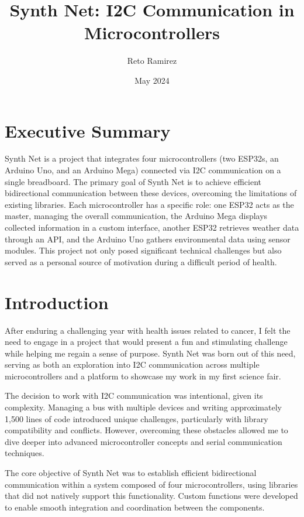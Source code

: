 \documentclass[a4paper,12pt]{report}
\title{Synth Net: I2C Communication in Microcontrollers}
\author{Reto Ramirez}
\date{May 2024}
\begin{document}
\maketitle

\tableofcontents
\newpage

\chapter*{Executive Summary}
Synth Net is a project that integrates four microcontrollers (two ESP32s, an Arduino Uno, and an Arduino Mega) connected via I2C communication on a single breadboard. The primary goal of Synth Net is to achieve efficient bidirectional communication between these devices, overcoming the limitations of existing libraries. Each microcontroller has a specific role: one ESP32 acts as the master, managing the overall communication, the Arduino Mega displays collected information in a custom interface, another ESP32 retrieves weather data through an API, and the Arduino Uno gathers environmental data using sensor modules. This project not only posed significant technical challenges but also served as a personal source of motivation during a difficult period of health.
\newpage

\chapter{Introduction}
After enduring a challenging year with health issues related to cancer, I felt the need to engage in a project that would present a fun and stimulating challenge while helping me regain a sense of purpose. Synth Net was born out of this need, serving as both an exploration into I2C communication across multiple microcontrollers and a platform to showcase my work in my first science fair.

The decision to work with I2C communication was intentional, given its complexity. Managing a bus with multiple devices and writing approximately 1,500 lines of code introduced unique challenges, particularly with library compatibility and conflicts. However, overcoming these obstacles allowed me to dive deeper into advanced microcontroller concepts and serial communication techniques.

The core objective of Synth Net was to establish efficient bidirectional communication within a system composed of four microcontrollers, using libraries that did not natively support this functionality. Custom functions were developed to enable smooth integration and coordination between the components.
\end{document}
